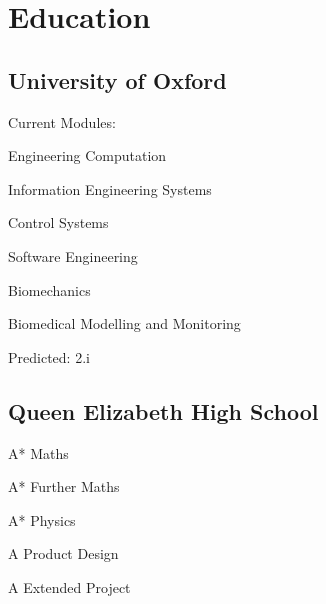 \documentclass[]{cv_class}
\begin{document}
\lastupdated

%
%


%
%
\vspace{3\topsep}
\begin{minipage}[t]{0.33\textwidth} 

\section{Education} 

\subsection{University of Oxford}
{Current Modules:}
\begin{minitemize}
\item Engineering Computation
\item Information Engineering Systems
\item Control Systems
\item Software Engineering
\item Biomechanics
\item Biomedical Modelling and Monitoring
\end{minitemize}
{ Predicted:} 2.i
\sectionsep

\subsection{\normalsize Queen Elizabeth High School}
\vspace{-\topsep}
\begin{minitemize}
\item A* { Maths}
\item A* { Further Maths}
\item A* { Physics}
\item A 	{ Product Design}
\item A 	{ Extended Project}
\end{minitemize}
\vspace{-\topsep}
\sectionsep


\end{minipage}
\end{document}
